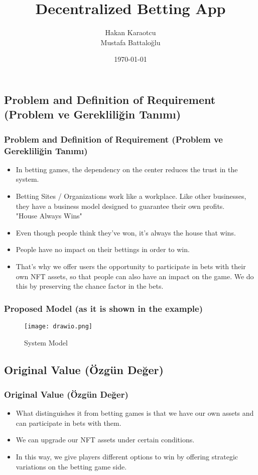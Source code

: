 \documentclass{beamer}
\title[CENG3550]{ Decentralized Betting App } %
\author{Hakan Karaotcu\\ Mustafa Battaloğlu} %
\institute[MSKÜ] %
{
MSKÜ\\ %
\medskip
\textit{hakankaraotcu@gmail.com\\mmbattaloglu@gmail.com} %
}
\date{\today} %
\begin{document}
\begin{frame}
\titlepage %
\end{frame}



\subsection {Problem and Definition of Requirement (Problem ve Gerekliliğin Tanımı)} 

\begin{frame}
\frametitle{Problem and Definition of Requirement (Problem ve Gerekliliğin Tanımı)}
\begin{itemize}
\item In betting games, the dependency on the center reduces the trust in the system.
\item Betting Sites / Organizations work like a workplace. Like other businesses, they have a business model designed to guarantee their own profits.
\\"House Always Wins"
\item Even though people think they've won, it's always the house that wins.
\item People have no impact on their bettings in order to win.
\item That's why we offer users the opportunity to participate in bets with their own NFT assets, so that people can also have an impact on the game. We do this by preserving the chance factor in the bets.

\end{itemize}
\end{frame}


\begin{frame}
\frametitle{Proposed Model (as it is shown in the example)}
\begin{figure}[h!]
\begin{center}
\texttt{[image: drawio.png]}
\caption{System Model}
\label{fig0}
\end{center}
\end{figure}

\end{frame}

\subsection {Original Value (Özgün Değer)} 

\begin{frame}
\frametitle{Original Value (Özgün Değer)}
\begin{itemize}
\item What distinguishes it from betting games is that we have our own assets and can participate in bets with them.
\item We can upgrade our NFT assets under certain conditions.
\item In this way, we give players different options to win by offering strategic variations on the betting game side.
\end{itemize}
\end{frame}
\end{document}
